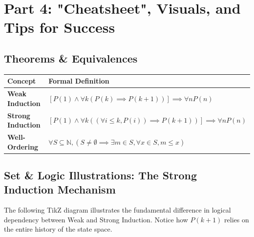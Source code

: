 \documentclass[11pt, a4paper]{article}
\theoremstyle{definition}
\theoremstyle{remark}
\newcommand{\N}{\mathbb{N}}
\begin{document}
\section{Part 4: "Cheatsheet", Visuals, and Tips for Success}

\subsection{Theorems \& Equivalences}
\begin{table}[h!]
    \centering
    \renewcommand{\arraystretch}{1.5}
    \begin{tabularx}{\textwidth}{l X}
        \toprule
        \textbf{Concept} & \textbf{Formal Definition} \\
        \midrule
        \textbf{Weak Induction} & $\displaystyle [P(1) \land \forall k (P(k) \implies P(k+1))] \implies \forall n P(n)$ \\
        \textbf{Strong Induction} & $\displaystyle [P(1) \land \forall k ((\forall i \le k, P(i)) \implies P(k+1))] \implies \forall n P(n)$ \\
        \textbf{Well-Ordering} & $\displaystyle \forall S \subseteq \N, (S \neq \emptyset \implies \exists m \in S, \forall x \in S, m \le x)$ \\
        \bottomrule
    \end{tabularx}
\end{table}

\subsection{Set \& Logic Illustrations: The Strong Induction Mechanism}
The following TikZ diagram illustrates the fundamental difference in logical dependency between Weak and Strong Induction. Notice how $P(k+1)$ relies on the entire history of the state space.
\end{document}
